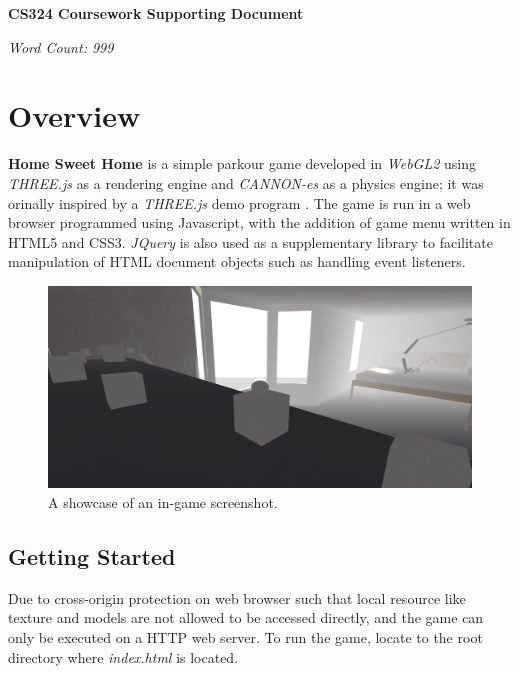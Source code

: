 \documentclass[12pt, a4paper, oneside]{article}
\begin{document}
    \LARGE
    \begin{center}
        \textbf{CS324 Coursework Supporting Document}
    \end{center}

    \flushleft
    \small

    \textit{Word Count: 999}

    \normalsize

    \section{Overview}

    \textbf{Home Sweet Home} is a simple parkour game developed in \textit{WebGL2} using \textit{THREE.js} \cite{three} as a rendering engine and \textit{CANNON-es} \cite{cannon-es} as a physics engine; it was orinally inspired by a \textit{THREE.js} demo program \cite{original_inspiration}. The game is run in a web browser programmed using Javascript, with the addition of game menu written in HTML5 and CSS3. \textit{JQuery} \cite{jquery} is also used as a supplementary library to facilitate manipulation of HTML document objects such as handling event listeners.

    \begin{figure}[H]
        \includegraphics[width=\textwidth]{showcase.png}
        \caption{A showcase of an in-game screenshot.}
    \end{figure}

    \subsection{Getting Started}

    Due to cross-origin protection on web browser such that local resource like texture and models are not allowed to be accessed directly, and the game can only be executed on a HTTP web server. To run the game, locate to the root directory where \textit{index.html} is located.
\end{document}
